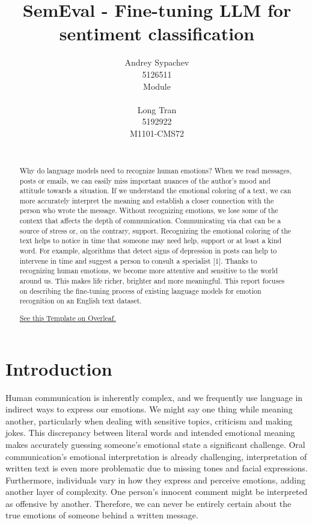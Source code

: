 \documentclass[11pt]{article}
\title{SemEval - Fine-tuning LLM for sentiment classification}
\author{Andrey Sypachev \\
  5126511\\
  Module \\
  \\\And
  Long Tran \\
  5192922\\
  M1101-CMS72 \\
  \\}
\begin{document}
\maketitle
\begin{abstract}
Why do language models need to recognize human emotions?
When we read messages, posts or emails, we can easily miss important nuances of the author's mood and attitude towards a situation. If we understand the emotional coloring of a text, we can more accurately interpret the meaning and establish a closer connection with the person who wrote the message. Without recognizing emotions, we lose some of the context that affects the depth of communication. Communicating via chat can be a source of stress or, on the contrary, support. Recognizing the emotional coloring of the text helps to notice in time that someone may need help, support or at least a kind word. For example, algorithms that detect signs of depression in posts can help to intervene in time and suggest a person to consult a specialist [1]. Thanks to recognizing human emotions, we become more attentive and sensitive to the world around us. This makes life richer, brighter and more meaningful.
This report focuses on describing the fine-tuning process of existing language models for emotion recognition on an English text dataset.

\href{https://www.overleaf.com/project/67469c50cdaee20b5e17b6e9}{See this Template on Overleaf.}
\end{abstract}

\section{Introduction}

Human communication is inherently complex, and we frequently use language in indirect ways to express our emotions. We might say one thing while meaning another, particularly when dealing with sensitive topics, criticism and making jokes. This discrepancy between literal words and intended emotional meaning makes accurately guessing someone's emotional state a significant challenge. Oral communication's emotional interpretation is already challenging, interpretation of written text is even more problematic due to missing tones and facial expressions. Furthermore, individuals vary in how they express and perceive emotions, adding another layer of complexity. One person's innocent comment might be interpreted as offensive by another. Therefore, we can never be entirely certain about the true emotions of someone behind a written message.
\end{document}
